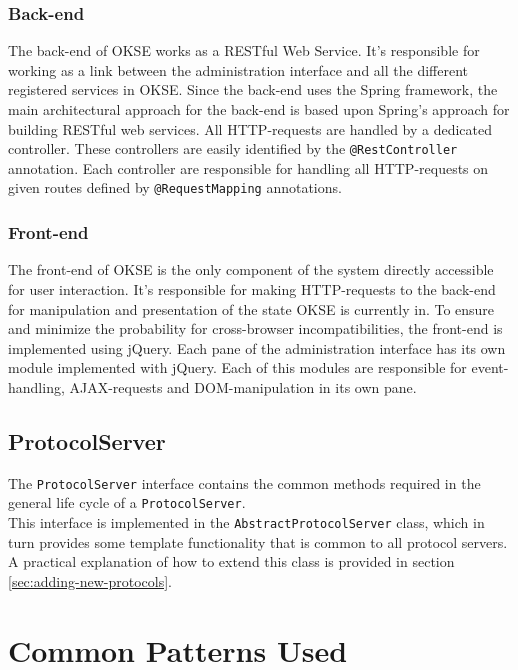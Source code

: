 \subsubsection{Back-end}

The back-end of OKSE works as a RESTful Web Service. It's responsible for working as a link between the administration interface and all the different registered services in OKSE. Since the back-end uses the Spring framework, the main architectural approach for the back-end is based upon Spring’s approach for building RESTful web services. All HTTP-requests are handled by a dedicated controller. These controllers are easily identified by the \verb!@RestController! annotation. Each controller are responsible for handling all HTTP-requests on given routes defined by \verb!@RequestMapping! annotations.  

\subsubsection{Front-end}

The front-end of OKSE is the only component of the system directly accessible for user interaction. It's responsible for making HTTP-requests to the back-end for manipulation and presentation of the state OKSE is currently in. To ensure and minimize the probability for cross-browser incompatibilities, the front-end is implemented using jQuery. Each pane of the administration interface has its own module implemented with jQuery. Each of this modules are responsible for event-handling, AJAX-requests and DOM-manipulation in its own pane.

\subsection{ProtocolServer}

The \verb!ProtocolServer! interface contains the common methods required in the general life cycle of a \verb!ProtocolServer!.\\This interface is implemented in the \verb!AbstractProtocolServer! class, which in turn provides some template functionality that is common to all protocol servers. A practical explanation of how to extend this class is provided in section \ref{sec:adding-new-protocols}.

\section{Common Patterns Used}
\label{sec:common-patterns-used}

